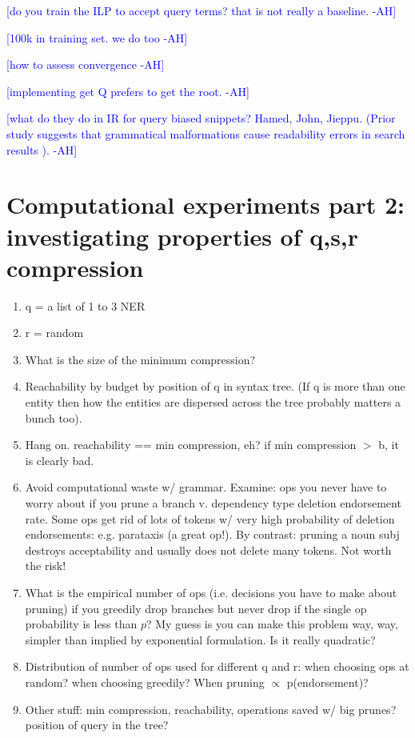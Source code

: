 \documentclass[11pt,a4paper]{article}
\newcommand{\ahcomment}[1]{\textcolor{blue}{[#1 -AH]}}
\begin{document}
\ahcomment{do you train the ILP to accept query terms? that is not really a baseline. }

\ahcomment{100k in training set. we do too }

\ahcomment{how to assess convergence}

\ahcomment{implementing get Q prefers to get the root. }


\ahcomment{what do they do in IR for query biased snippets? Hamed, John, Jieppu.
 (Prior study suggests that grammatical malformations cause readability errors in search results \cite{kanungo2009predicting}).}

\section{Computational experiments part 2: investigating properties of q,s,r compression}
\begin{enumerate}
\item{q = a list of 1 to 3 NER}
\item{r = random}
\item{What is the size of the minimum compression?}
\item{Reachability by budget by position of q in syntax tree. (If q is more than one entity then how the entities are dispersed across the tree probably matters a bunch too).}
\item{Hang on. reachability == min compression, eh? if min compression $>$ b, it is clearly bad.}
\item{Avoid computational waste w/ grammar.  Examine: ops you never have to worry about if you prune a branch v. dependency type deletion endorsement rate. Some ops get rid of lots of tokens w/ very high probability of deletion endorsements: e.g. parataxis (a great op!). By contrast: pruning a noun subj destroys acceptability and usually does not delete many tokens. Not worth the risk!}
\item{What is the empirical number of ops (i.e. decisions you have to make about pruning) if you greedily drop branches but never drop if the single op probability is less than $p$? My guess is you can make this problem way, way, simpler than implied by exponential formulation. Is it really quadratic?}
\item{Distribution of number of ops used for different q and r: when choosing ops at random? when choosing greedily? When pruning $\propto$ p(endorsement)?}
\item{Other stuff: min compression, reachability, operations saved w/ big prunes? position of query in the tree?}
\end{enumerate}
\end{document}
